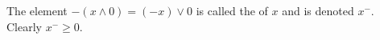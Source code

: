 The element $-(x \wedge 0) = (-x) \vee 0$ is called the  of $x$ and is denoted $x^-$. Clearly $x^- \geq 0$.
